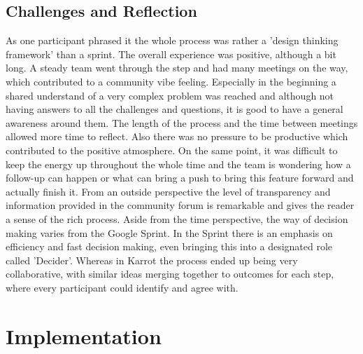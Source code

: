 \documentclass[
	a4paper,%
	11pt,%
	]{article}
\begin{document}
\subsection{Challenges and Reflection}

As one participant phrased it the whole process was rather a 'design thinking framework' than a sprint. The overall experience was positive, although a bit long. A steady team went through the step and had many meetings on the way, which contributed to a community vibe feeling. Especially in the beginning a shared understand of a very complex problem was reached and although not having answers to all the challenges and questions, it is good to have a general awareness around them. The length of the process and the time between meetings allowed more time to reflect. Also there was no pressure to be productive which contributed to the positive atmosphere. On the same point, it was difficult to keep the energy up throughout the whole time and the team is wondering how a follow-up can happen or what can bring a push to bring this feature forward and actually finish it. From an outside perspective the level of transparency and information provided in the community forum is remarkable and gives the reader a sense of the rich process. Aside from the time perspective, the way of decision making varies from the Google Sprint. In the Sprint there is an emphasis on efficiency and fast decision making, even bringing this into a designated role called 'Decider'. Whereas in Karrot the process ended up being very collaborative, with similar ideas merging together to outcomes for each step, where every participant could identify and agree with.



\section{Implementation}
\end{document}
